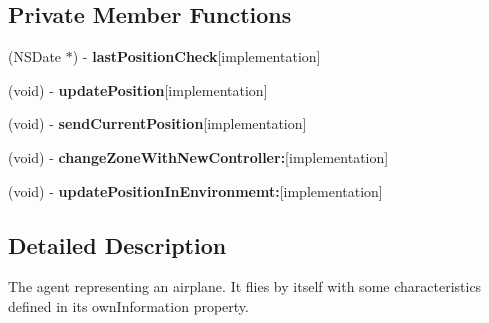 \subsection*{\-Private \-Member \-Functions}
\begin{DoxyCompactItemize}
\item 
\hypertarget{interface_airplane_a88a0d3040e9ad781914262e202a30415}{
(\-N\-S\-Date $\ast$) -\/ {\bfseries last\-Position\-Check}{\ttfamily  \mbox{[}implementation\mbox{]}}}
\label{interface_airplane_a88a0d3040e9ad781914262e202a30415}

\item 
\hypertarget{interface_airplane_a12fbc6e73f3bba427f33fc7958b24baa}{
(void) -\/ {\bfseries update\-Position}{\ttfamily  \mbox{[}implementation\mbox{]}}}
\label{interface_airplane_a12fbc6e73f3bba427f33fc7958b24baa}

\item 
\hypertarget{interface_airplane_ac53b2796a475adee695001e7e47d8728}{
(void) -\/ {\bfseries send\-Current\-Position}{\ttfamily  \mbox{[}implementation\mbox{]}}}
\label{interface_airplane_ac53b2796a475adee695001e7e47d8728}

\item 
\hypertarget{interface_airplane_a1a093752da09714abd1ce75a1e3abf7c}{
(void) -\/ {\bfseries change\-Zone\-With\-New\-Controller\-:}{\ttfamily  \mbox{[}implementation\mbox{]}}}
\label{interface_airplane_a1a093752da09714abd1ce75a1e3abf7c}

\item 
\hypertarget{interface_airplane_a5d0fb5ca4531152fc86b396573df03a4}{
(void) -\/ {\bfseries update\-Position\-In\-Environmemt\-:}{\ttfamily  \mbox{[}implementation\mbox{]}}}
\label{interface_airplane_a5d0fb5ca4531152fc86b396573df03a4}

\end{DoxyCompactItemize}


\subsection{\-Detailed \-Description}
\-The agent representing an airplane. \-It flies by itself with some characteristics defined in its own\-Information property. 


